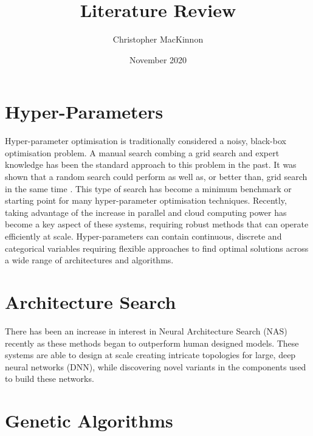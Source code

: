 \documentclass{article}
\title{Literature Review}
\author{Christopher MacKinnon }
\date{November 2020}
\begin{document}
\maketitle


\section{Hyper-Parameters}

	Hyper-parameter optimisation is traditionally considered a noisy, black-box optimisation problem. A manual search combing a grid search and expert knowledge has been the standard approach to this problem in the past. It was shown that a random search could perform as well as, or better than, grid search in the same time \cite{50}. This type of search has become a minimum benchmark or starting point for many hyper-parameter optimisation techniques. \cite{39}\cite{48} Recently, taking advantage of the increase in parallel and cloud computing power has become a key aspect of these systems, requiring robust methods that can operate efficiently at scale. Hyper-parameters can contain continuous, discrete and categorical variables requiring flexible approaches to find optimal solutions across a wide range of architectures and algorithms. 



\section {Architecture Search}

	There has been an increase in interest in Neural Architecture Search (NAS) recently as these methods began to outperform human designed models. \cite{51}\cite{41} These systems are able to design at scale creating intricate topologies for large, deep neural networks (DNN), while discovering novel variants in the components used to build these networks. \cite{25} \cite{4}



	




\section {Genetic Algorithms}
\end{document}
